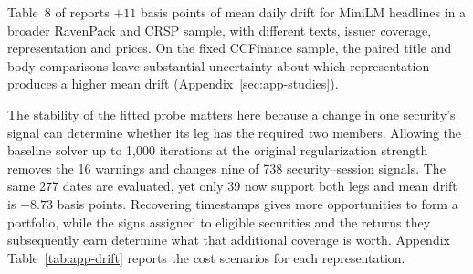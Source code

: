 Table~8 of
\citet{lopez2025v6} reports $+11$ basis points of mean daily drift for
MiniLM headlines in a broader RavenPack and CRSP sample, with different
texts, issuer coverage, representation and prices. On the fixed
CCFinance sample, the paired title and body comparisons leave substantial
uncertainty about which representation produces a higher mean drift
(Appendix~\ref{sec:app-studies}).

The stability of the fitted probe matters here because a change in
one security's signal can determine whether its leg has the required
two members. Allowing the baseline solver up to 1,000
iterations at the original regularization strength removes the 16
warnings and changes nine of 738 security--session signals. The same
277 dates are evaluated, yet only 39 now support both legs and mean
drift is $-8.73$ basis points. Recovering timestamps gives more
opportunities to form a portfolio, while the signs assigned to eligible
securities and the returns they subsequently earn determine what that
additional coverage is worth. Appendix Table~\ref{tab:app-drift}
reports the cost scenarios for each representation.
